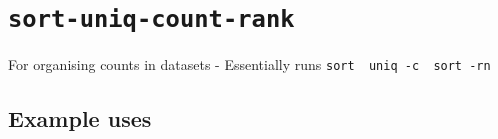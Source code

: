     
    
    

    
    \section{\texorpdfstring{\texttt{sort-uniq-count-rank}}{sort-uniq-count-rank}}\label{sort-uniq-count-rank}

For organising counts in datasets - Essentially runs
\texttt{sort\ \textbar{}\ uniq\ -c\ \textbar{}\ sort\ -rn}

    \subsection{Example uses}\label{example-uses}

    \begin{Shaded}
\begin{Highlighting}[]
\KeywordTok{|}  \KeywordTok{|} 


\end{Highlighting}
\end{Shaded}
